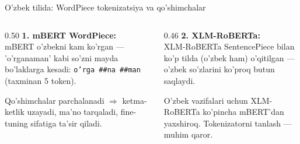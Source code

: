 \documentclass[aspectratio=169,11pt]{beamer}
\begin{document}
\begin{frame}{O'zbek tilida: WordPiece tokenizatsiya va qo'shimchalar}
  \begin{columns}[T]
    \begin{column}{0.50\textwidth}
      \textbf{1. mBERT WordPiece:}\\[3pt]
      \small
      mBERT o'zbekni kam ko'rgan --- 'o'rganaman' kabi so'zni mayda bo'laklarga
      kesadi: \texttt{o'rga \#\#na \#\#man} (taxminan 5 token).
      \begin{tcolorbox}[warnbox,title=Muammo,top=2pt,bottom=2pt]
        \footnotesize
        Qo'shimchalar parchalanadi $\Rightarrow$ ketma-ketlik uzayadi, ma'no
        tarqaladi, fine-tuning sifatiga ta'sir qiladi.
      \end{tcolorbox}
    \end{column}
    \begin{column}{0.46\textwidth}
      \textbf{2. XLM-RoBERTa:}\\[3pt]
      \small
      XLM-RoBERTa SentencePiece bilan ko'p tilda (o'zbek ham) o'qitilgan ---
      o'zbek so'zlarini ko'proq butun saqlaydi.
      \begin{tcolorbox}[okbox,top=2pt,bottom=2pt]
        \footnotesize
        O'zbek vazifalari uchun XLM-RoBERTa ko'pincha mBERT'dan yaxshiroq.
        Tokenizatorni tanlash --- muhim qaror.
      \end{tcolorbox}
    \end{column}
  \end{columns}
\end{frame}
\end{document}
